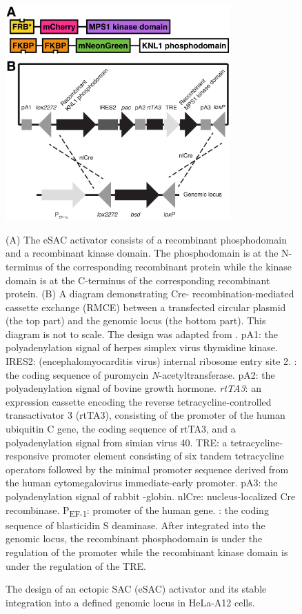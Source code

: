 \begin{figure}
    \centering
    \includegraphics[width=0.77\textwidth]{chapters/figures/eSAC+Cre-lox.pdf}
    \caption{The design of an ectopic SAC (eSAC) activator and its stable integration into a defined genomic locus in HeLa-A12 cells.}
    \noindent\justifying (A) The eSAC activator consists of a recombinant  phosphodomain and a recombinant  kinase domain. The phosphodomain is at the N-terminus of the corresponding recombinant protein while the kinase domain is at the C-terminus of the corresponding recombinant protein. (B) A diagram demonstrating Cre- recombination-mediated cassette exchange (RMCE) between a transfected circular plasmid (the top part) and the genomic locus (the bottom part). This diagram is not to scale. The design was adapted from \cite{HeLa-A12_Khandelia2011, HeLa-A12_Ballister2014}. pA1: the polyadenylation signal of herpes simplex virus thymidine kinase. IRES2: (encephalomyocarditis virus) internal ribosome entry site 2. : the coding sequence of puromycin \textit{N}-acetyltransferase. pA2: the polyadenylation signal of bovine growth hormone. \textit{rtTA3}: an expression cassette encoding the reverse tetracycline-controlled transactivator 3 (rtTA3), consisting of the promoter of the human ubiquitin C gene, the coding sequence of rtTA3, and a polyadenylation signal from simian virus 40. TRE: a tetracycline-responsive promoter element consisting of six tandem tetracycline operators followed by the minimal promoter sequence derived from the human cytomegalovirus immediate-early promoter. pA3: the polyadenylation signal of rabbit \textbeta{}-globin. nlCre: nucleus-localized Cre recombinase. P\textsubscript{EF-1\textalpha{}}: promoter of the human  gene. : the coding sequence of blasticidin S deaminase. After integrated into the genomic locus, the recombinant phosphodomain is under the regulation of the  promoter while the recombinant kinase domain is under the regulation of the TRE.
    \label{eSAC+Cre-lox}
\end{figure}

